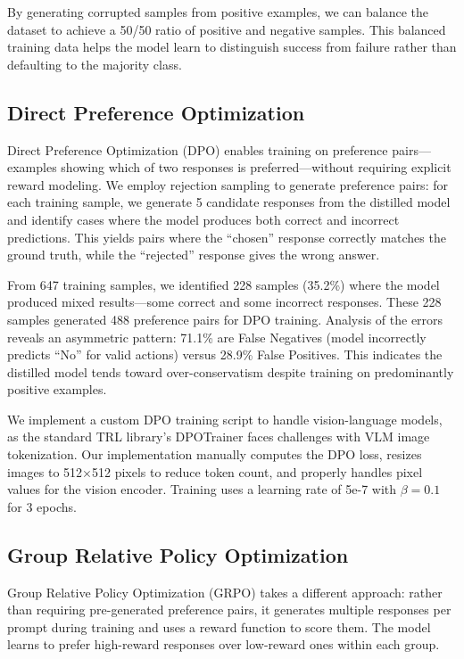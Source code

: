 \documentclass[11pt,a4paper]{article}
\begin{document}
By generating corrupted samples from positive examples, we can balance the dataset to achieve a 50/50 ratio of positive and negative samples. This balanced training data helps the model learn to distinguish success from failure rather than defaulting to the majority class.

\subsection{Direct Preference Optimization}

Direct Preference Optimization (DPO) enables training on preference pairs---examples showing which of two responses is preferred---without requiring explicit reward modeling. We employ rejection sampling to generate preference pairs: for each training sample, we generate 5 candidate responses from the distilled model and identify cases where the model produces both correct and incorrect predictions. This yields pairs where the ``chosen'' response correctly matches the ground truth, while the ``rejected'' response gives the wrong answer.

From 647 training samples, we identified 228 samples (35.2\%) where the model produced mixed results---some correct and some incorrect responses. These 228 samples generated 488 preference pairs for DPO training. Analysis of the errors reveals an asymmetric pattern: 71.1\% are False Negatives (model incorrectly predicts ``No'' for valid actions) versus 28.9\% False Positives. This indicates the distilled model tends toward over-conservatism despite training on predominantly positive examples.

We implement a custom DPO training script to handle vision-language models, as the standard TRL library's DPOTrainer faces challenges with VLM image tokenization. Our implementation manually computes the DPO loss, resizes images to 512$\times$512 pixels to reduce token count, and properly handles pixel values for the vision encoder. Training uses a learning rate of 5e-7 with $\beta=0.1$ for 3 epochs.

\subsection{Group Relative Policy Optimization}

Group Relative Policy Optimization (GRPO) takes a different approach: rather than requiring pre-generated preference pairs, it generates multiple responses per prompt during training and uses a reward function to score them. The model learns to prefer high-reward responses over low-reward ones within each group.
\end{document}
